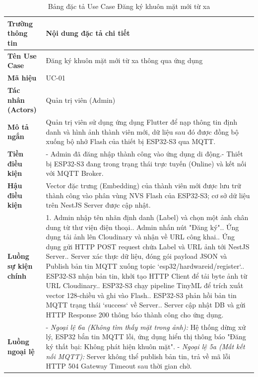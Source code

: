 

\begin{table}[htbp]
    \centering
    \caption{Bảng đặc tả Use Case Đăng ký khuôn mặt mới từ xa}
    \label{tab:spec_uc_enroll}
    \begin{tabular}{|p{3.5cm}|p{9.5cm}|}
        \hline
        \textbf{Trường thông tin} & \textbf{Nội dung đặc tả chi tiết} \\ \hline
        \textbf{Tên Use Case} & Đăng ký khuôn mặt mới từ xa thông qua ứng dụng \\ \hline
        \textbf{Mã hiệu} & UC-01 \\ \hline
        \textbf{Tác nhân (Actors)} & Quản trị viên (Admin) \\ \hline
        \textbf{Mô tả ngắn} & Quản trị viên sử dụng ứng dụng Flutter để nạp thông tin định danh và hình ảnh thành viên mới, dữ liệu sau đó được đồng bộ xuống bộ nhớ Flash của thiết bị ESP32-S3 qua MQTT. \\ \hline
        \textbf{Tiền điều kiện} & - Admin đã đăng nhập thành công vào ứng dụng di động.\newline - Thiết bị ESP32-S3 đang trong trạng thái trực tuyến (Online) và kết nối với MQTT Broker. \\ \hline
        \textbf{Hậu điều kiện} & Vector đặc trưng (Embedding) của thành viên mới được lưu trữ thành công vào phân vùng NVS Flash của ESP32-S3; cơ sở dữ liệu trên NestJS Server được cập nhật. \\ \hline
        \textbf{Luồng sự kiện chính} &
        1. Admin nhập tên nhãn định danh (Label) và chọn một ảnh chân dung từ thư viện điện thoại.\newline
        2. Admin nhấn nút "Đăng ký".\newline
        3. Ứng dụng tải ảnh lên Cloudinary và nhận về URL công khai.\newline
        4. Ứng dụng gửi HTTP POST request chứa Label và URL ảnh tới NestJS Server.\newline
        5. Server xác thực dữ liệu, đóng gói payload JSON và Publish bản tin MQTT xuống topic `esp32/hardwareid/register`.\newline
        6. ESP32-S3 nhận bản tin, khởi tạo HTTP Client để tải byte ảnh từ URL Cloudinary.\newline
        7. ESP32-S3 chạy pipeline TinyML để trích xuất vector 128-chiều và ghi vào Flash.\newline
        8. ESP32-S3 phản hồi bản tin MQTT trạng thái `success` về Server.\newline
        9. Server cập nhật DB và gửi HTTP Response 200 thông báo thành công cho ứng dụng. \\ \hline
        \textbf{Luồng ngoại lệ} &
        - \textit{Ngoại lệ 6a (Không tìm thấy mặt trong ảnh):} Hệ thống dừng xử lý, ESP32 bắn tin MQTT lỗi, ứng dụng hiển thị thông báo "Đăng ký thất bại: Không phát hiện khuôn mặt".\newline
        - \textit{Ngoại lệ 5a (Mất kết nối MQTT):} Server không thể publish bản tin, trả về mã lỗi HTTP 504 Gateway Timeout sau thời gian chờ. \\ \hline
    \end{tabular}
\end{table}